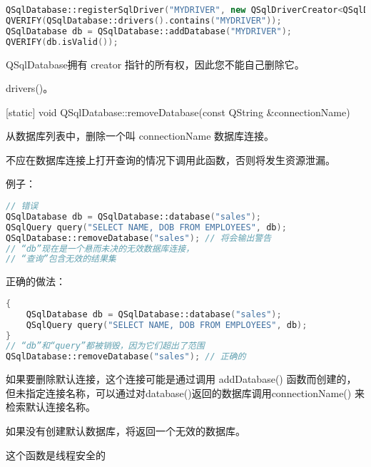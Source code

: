 \begin{lstlisting}[language=C++]
QSqlDatabase::registerSqlDriver("MYDRIVER", new QSqlDriverCreator<QSqlDriver>);
QVERIFY(QSqlDatabase::drivers().contains("MYDRIVER"));
QSqlDatabase db = QSqlDatabase::addDatabase("MYDRIVER");
QVERIFY(db.isValid());
\end{lstlisting}

QSqlDatabase拥有 creator 指针的所有权，因此您不能自己删除它。

\begin{seeAlso}
drivers()。
\end{seeAlso}

[static] void QSqlDatabase::removeDatabase(const QString \&connectionName)


从数据库列表中，删除一个叫 connectionName 数据库连接。

\begin{warning}
不应在数据库连接上打开查询的情况下调用此函数，否则将发生资源泄漏。
\end{warning}

\clearpage

例子：

\begin{lstlisting}[language=C++]
// 错误
QSqlDatabase db = QSqlDatabase::database("sales");
QSqlQuery query("SELECT NAME, DOB FROM EMPLOYEES", db);
QSqlDatabase::removeDatabase("sales"); // 将会输出警告
// “db”现在是一个悬而未决的无效数据库连接，
// “查询”包含无效的结果集
\end{lstlisting}


正确的做法：

\begin{lstlisting}[language=C++]
{
    QSqlDatabase db = QSqlDatabase::database("sales");
    QSqlQuery query("SELECT NAME, DOB FROM EMPLOYEES", db);
}
// “db”和“query”都被销毁，因为它们超出了范围
QSqlDatabase::removeDatabase("sales"); // 正确的
\end{lstlisting}

如果要删除默认连接，这个连接可能是通过调用 addDatabase() 函数而创建的，但未指定连接名称，可以通过对database()返回的数据库调用connectionName() 来检索默认连接名称。

\begin{notice}
如果没有创建默认数据库，将返回一个无效的数据库。
\end{notice}

\begin{notice}
这个函数是线程安全的
\end{notice}

